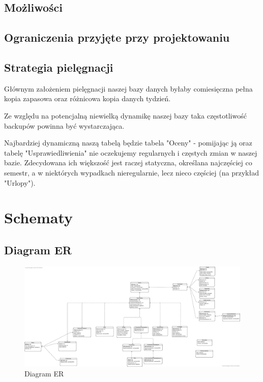 \documentclass[60pt]{article}
\begin{document}
\subsection{Możliwości}

\subsection{Ograniczenia przyjęte przy projektowaniu}

\subsection{Strategia pielęgnacji}

Głównym założeniem pielęgnacji naszej bazy danych byłaby comiesięczna pełna kopia zapasowa oraz różnicowa kopia danych tydzień. 

Ze względu na potencjalną niewielką dynamikę naszej bazy taka częstotliwość backupów powinna być wystarczająca. 

Najbardziej dynamiczną naszą tabelą będzie tabela "Oceny" - pomijając ją oraz tabelę "Usprawiedliwienia" nie oczekujemy regularnych i częstych zmian w naszej bazie. Zdecydowana ich większość jest raczej statyczna, określana najczęściej co semestr, a w niektórych wypadkach nieregularnie, lecz nieco częściej (na przykład "Urlopy").

\newpage
\section{Schematy}

\subsection{Diagram ER}

\begin{figure}
  \includegraphics[width=\linewidth]{diagram_ER.png}
  \caption{Diagram ER}
  \label{Diagram ER}
\end{figure}
\end{document}
